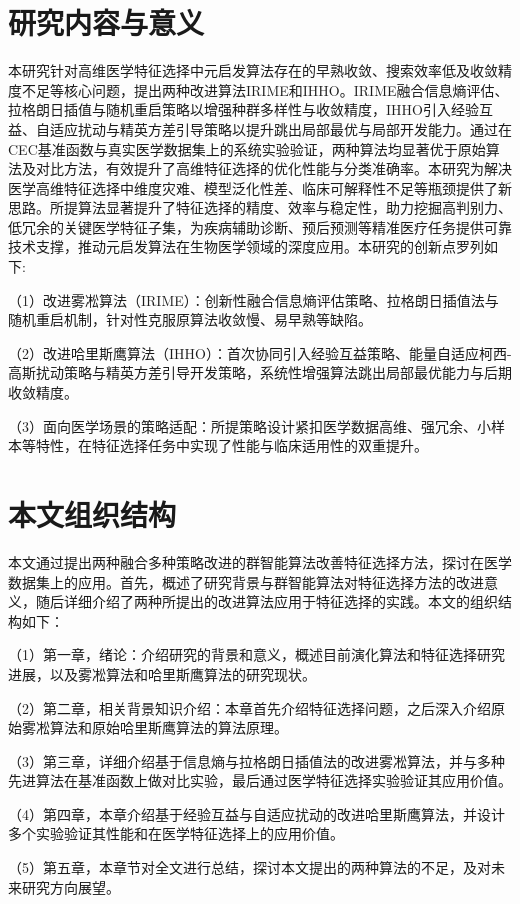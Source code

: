 \documentclass{wzuthesis}
\begin{document}
\section{研究内容与意义}
本研究针对高维医学特征选择中元启发算法存在的早熟收敛、搜索效率低及收敛精度不足等核心问题，提出两种改进算法IRIME和IHHO。IRIME融合信息熵评估、拉格朗日插值与随机重启策略以增强种群多样性与收敛精度，IHHO引入经验互益、自适应扰动与精英方差引导策略以提升跳出局部最优与局部开发能力。通过在CEC基准函数与真实医学数据集上的系统实验验证，两种算法均显著优于原始算法及对比方法，有效提升了高维特征选择的优化性能与分类准确率。本研究为解决医学高维特征选择中维度灾难、模型泛化性差、临床可解释性不足等瓶颈提供了新思路。所提算法显著提升了特征选择的精度、效率与稳定性，助力挖掘高判别力、低冗余的关键医学特征子集，为疾病辅助诊断、预后预测等精准医疗任务提供可靠技术支撑，推动元启发算法在生物医学领域的深度应用。本研究的创新点罗列如下:

（1）改进雾凇算法（IRIME）：创新性融合信息熵评估策略、拉格朗日插值法与随机重启机制，针对性克服原算法收敛慢、易早熟等缺陷。

（2）改进哈里斯鹰算法（IHHO）：首次协同引入经验互益策略、能量自适应柯西-高斯扰动策略与精英方差引导开发策略，系统性增强算法跳出局部最优能力与后期收敛精度。

（3）面向医学场景的策略适配：所提策略设计紧扣医学数据高维、强冗余、小样本等特性，在特征选择任务中实现了性能与临床适用性的双重提升。
\section{本文组织结构}
本文通过提出两种融合多种策略改进的群智能算法改善特征选择方法，探讨在医学数据集上的应用。首先，概述了研究背景与群智能算法对特征选择方法的改进意义，随后详细介绍了两种所提出的改进算法应用于特征选择的实践。本文的组织结构如下：

（1）第一章，绪论：介绍研究的背景和意义，概述目前演化算法和特征选择研究进展，以及雾凇算法和哈里斯鹰算法的研究现状。

（2）第二章，相关背景知识介绍：本章首先介绍特征选择问题，之后深入介绍原始雾凇算法和原始哈里斯鹰算法的算法原理。

（3）第三章，详细介绍基于信息熵与拉格朗日插值法的改进雾凇算法，并与多种先进算法在基准函数上做对比实验，最后通过医学特征选择实验验证其应用价值。

（4）第四章，本章介绍基于经验互益与自适应扰动的改进哈里斯鹰算法，并设计多个实验验证其性能和在医学特征选择上的应用价值。

（5）第五章，本章节对全文进行总结，探讨本文提出的两种算法的不足，及对未来研究方向展望。
\end{document}
